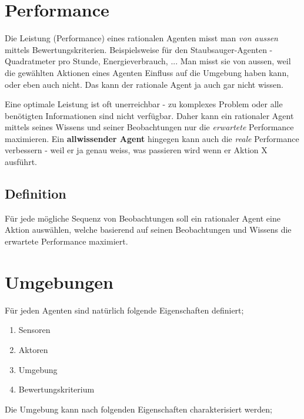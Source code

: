 \section{Performance}
Die Leistung (Performance) eines rationalen Agenten misst man \textit{von aussen} mittels Bewertungskriterien. Beispielsweise für den Staubsauger-Agenten - Quadratmeter pro Stunde, Energieverbrauch, ...  Man misst sie von aussen, weil die gewählten Aktionen eines Agenten Einfluss auf die Umgebung haben kann, oder eben auch nicht. Das kann der rationale Agent ja auch gar nicht wissen.

Eine optimale Leistung ist oft unerreichbar - zu komplexes Problem oder alle benötigten Informationen sind nicht verfügbar. Daher kann ein rationaler Agent mittels seines Wissens und seiner Beobachtungen nur die \textit{erwartete} Performance maximieren. Ein \textbf{allwissender Agent} hingegen kann auch die \textit{reale} Performance verbessern - weil er ja genau weiss, was passieren wird wenn er Aktion X ausführt.

\subsection{Definition}
Für jede mögliche Sequenz von Beobachtungen soll ein rationaler Agent eine Aktion auswählen, welche basierend auf seinen Beobachtungen und Wissens die erwartete Performance maximiert.

\section{Umgebungen}
Für jeden Agenten sind natürlich folgende Eigenschaften definiert;
\begin{enumerate}
	\item Sensoren
	\item Aktoren
	\item Umgebung
	\item Bewertungskriterium
\end{enumerate}

Die Umgebung kann nach folgenden Eigenschaften charakterisiert werden;


